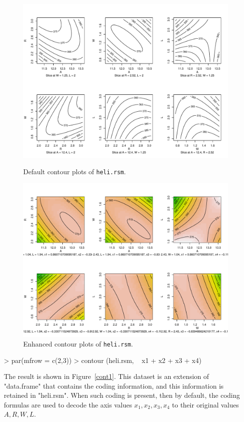 \documentclass[article,nojss]{jss}
\begin{document}
\begin{figure}
\begin{center}
\includegraphics[width=.95\linewidth, viewport=0 10 560 396, clip]{rsm-plots-cont1.pdf}
\end{center}
\vspace{-26pt}
\caption{Default contour plots of \texttt{heli.rsm}.}\label{cont1}
\begin{center}
\includegraphics[width=.95\linewidth, viewport=0 10 560 422, clip]{rsm-plots-cont2.pdf}
\end{center}
\vspace{-26pt}
\caption{Enhanced contour plots of \texttt{heli.rsm}.}\label{cont2}
\end{figure}
\begin{Schunk}
\begin{Sinput}
> par(mfrow = c(2,3))
> contour (heli.rsm, ~ x1 + x2 + x3 + x4)
\end{Sinput}
\end{Schunk}
The result is shown in Figure~\ref{cont1}.  This dataset is an extension of "data.frame" that contains the coding information, and this information is retained in "heli.rsm".  When such coding is present, then by default, the coding formulas are used to decode the axis values $x_1,x_2,x_3,x_4$ to their original values $A,R,W,L$.
\end{document}
